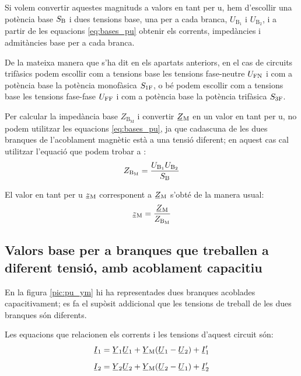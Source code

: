 Si volem convertir aquestes magnituds a valors en tant per u, hem d'escollir  una potència base $S_\mathrm{B}$ i dues tensions base, una  per a cada branca, $U_{\text{B}_1}$ i  $U_{\text{B}_2}$, i a partir de les equacions \eqref{eq:bases_pu} obtenir els corrents, impedàncies i admitàncies base per a cada branca.

De la mateixa manera que s'ha dit en els apartats anteriors, en el cas de circuits trifàsics podem escollir com a tensions base les tensions fase-neutre $U_\mathrm{FN}$ i com a potència base la potència  monofàsica $S_\mathrm{1F}$, o bé podem escollir com a tensions base les tensions fase-fase $U_\mathrm{FF}$ i com a potència base la potència trifàsica $S_\mathrm{3F}$.


Per calcular la impedància base $Z_{\text{B}_\text{M}}$ i convertir $\cmplx{Z}\ped{M}$ en un valor en tant per u, no podem utilitzar les equacions \eqref{eq:bases_pu}, ja que cadascuna de les dues branques de l'acoblament magnètic està a una tensió diferent; en aquest cas cal utilitzar l'equació que podem trobar a \cite{TLE}:
\begin{equation}
    Z_{\text{B}_\text{M}} = \frac{U_{\text{B}_1} U_{\text{B}_2}} {S_\mathrm{B}}
\end{equation}

El valor en tant per u $\cmplx{z}\ped{M}$ corresponent a $\cmplx{Z}\ped{M}$ s'obté de la manera usual:
\begin{equation}
    \cmplx{z}\ped{M} = \frac{\cmplx{Z}\ped{M}}{Z_{\text{B}_\text{M}}}
\end{equation}


\subsection{Valors base per a branques que treballen a diferent tensió, amb acoblament capacitiu}

En la figura \vref{pic:pu_ym} hi ha representades dues branques acoblades capacitivament; es fa el supòsit addicional que les tensions de treball de les dues branques són diferents.

\begin{center}
    
    \label{pic:pu_ym}
\end{center}

Les equacions que relacionen els corrents i les tensions d'aquest circuit són:
\begin{subequations}
\begin{align}
    \cmplx{I}_1  &= \cmplx{Y}_1 \cmplx{U}_1 +  \cmplx{Y}\ped{M}(\cmplx{U}_1-\cmplx{U}_2)  + \cmplx{I}'_1   \\[2mm]
    \cmplx{I}_2  &= \cmplx{Y}_2 \cmplx{U}_2 +  \cmplx{Y}\ped{M}(\cmplx{U}_2-\cmplx{U}_1)  + \cmplx{I}'_2
\end{align}
\end{subequations}


